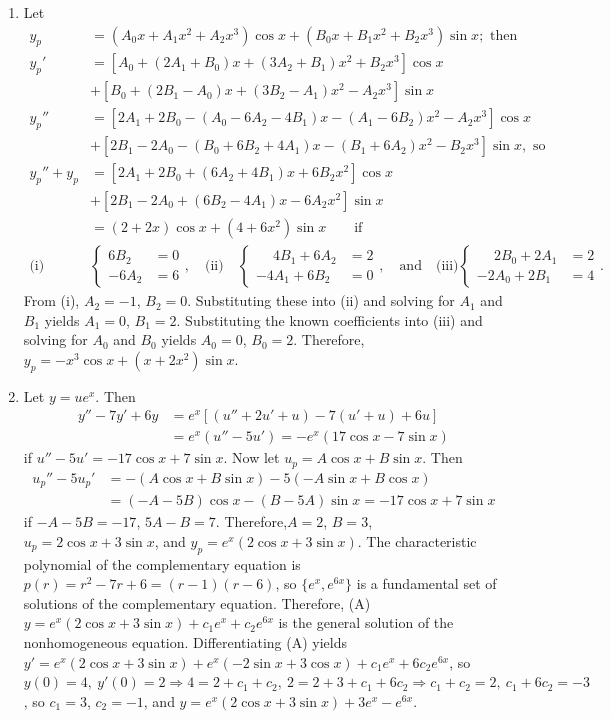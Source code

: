 \documentclass[openany]{book}
\newenvironment{sectionSolutions}{
 \begin{enumerate}[item-label={\thesection.\arabic{enumi}.}]
}{
 \end{enumerate}
}
\begin{document}
\begin{sectionSolutions}
\item
Let
\begin{align*}
y_p&=(A_0x+A_1x^2+A_2x^3)\cos x +(B_0x+B_1x^2+B_2x^3)\sin x;\text{ then}
\\ y_p'&=\left[A_0+(2A_1+B_0)x+(3A_2+B_1)x^2+B_2x^3\right]\cos x\\
&+\left[B_0+(2B_1-A_0)x+(3B_2-A_1)x^2-A_2x^3\right]\sin x\\
y_p''&=\left[2A_1+2B_0-(A_0-6A_2-4B_1)x-(A_1-6B_2)x^2-A_2x^3\right]\cos x\\
&+\left[2B_1-2A_0-(B_0+6B_2+4A_1)x-(B_1+6A_2)x^2-B_2x^3\right]\sin x, \text{ so}\\
y_p''+y_p&=\left[2A_1+2B_0+(6A_2+4B_1)x+6B_2x^2\right]\cos x\\
&+\left[2B_1-2A_0+(6B_2-4A_1)x-6A_2x^2\right]\sin x\\
&=(2+2x)\cos x+(4+6x^2)\sin x \qquad\text{if}\\
\text{(i)}&\begin{cases} 6B_2&=0\\-6A_2&=6\end{cases},\quad
\text{(ii)}\quad\begin{cases}\phantom{-}4B_1+6A_2&=2
\\-4A_1+6B_2&=0\end{cases},\quad\text{and}\quad
\text{(iii)}\begin{cases}\phantom{-}2B_0+2A_1&=2
\\-2A_0+2B_1&=4\end{cases}.
\end{align*}
From (i), $A_2=-1$, $B_2=0$. Substituting these into (ii) and solving
for $A_1$ and $B_1$ yields $A_1=0$, $B_1=2$. Substituting the known
coefficients into (iii) and solving for $A_0$ and $B_0$ yields
$A_0=0$, $B_0=2$. Therefore,$y_p=-x^3\cos x+(x+2x^2)\sin x$.




\item
Let $y=ue^x$. Then
\begin{align*}
y''-7y'+6y&=e^x\left[(u''+2u'+u)-7(u'+u)+6u\right]\\
&=e^x(u''-5u')=-e^x(17\cos x-7\sin x)
\end{align*}
 if $u''-5u'=-17\cos x+7\sin x$.
Now let  $u_p=A\cos x+B\sin x$. Then
\begin{align*}
u_p''-5u_p'&=-(A\cos x+B\sin x)-5(-A\sin x+B\cos x)\\
&= (-A-5B)\cos x-(B-5A)\sin x=-17\cos x+7\sin x
\end{align*}
if $-A-5B=-17$, $5A-B=7$. Therefore,$A=2$, $B=3$, $u_p=2\cos x+3\sin
x$, and $y_p=e^x(2\cos x+3\sin x)$. The characteristic polynomial of
the complementary equation is $p(r)=r^2-7r+6=(r-1)(r-6)$, so
$\{e^x,e^{6x}\}$ is a fundamental set of solutions of the
complementary equation. Therefore,
(A) $y=e^x(2\cos x+3\sin x)+c_1e^x+c_2e^{6x}$
is the general solution of the nonhomogeneous
equation. Differentiating (A) yields
$y'=e^x(2\cos x+3\sin x)+e^x(-2\sin x+3\cos x)+c_1e^x+6c_2e^{6x}$,
so $y(0)=4,\ y'(0)=2\Rightarrow 4=2+c_1+c_2,\
2=2+3+c_1+6c_2\Rightarrow c_1+c_2=2,\ c_1+6c_2=-3$, so $c_1=3$,
$c_2=-1$, and
 $y=e^x(2\cos x+3\sin x)+3e^x-e^{6x}$.



\end{sectionSolutions}
\end{document}
